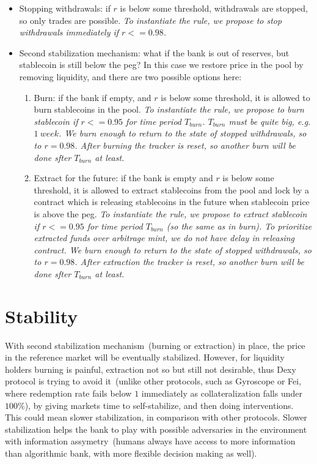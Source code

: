 \documentclass{article}   %
\newcommand{\sct}{stablecoin}
\newcommand{\dx}{Dexy}
\begin{document}
\begin{itemize}
   \item{Stopping withdrawals: } if $r$ is below some threshold, withdrawals are stopped, so only trades are possible.  
   \em{To instantiate the rule, we propose to stop withdrawals immediately if $r <= 0.98$.}

   \item{Second stabilization mechanism: } what if the bank is out of reserves, but \sct{} is still below the peg? In this case we restore price in the pool by removing liquidity, and there are two possible options here:

   \begin{enumerate}
   \item{Burn: } if the bank if empty, and $r$ is below some threshold, it is allowed to burn \sct{}s in the pool. 
   \em{To instantiate the rule, we propose to burn \sct{} if $r <= 0.95$ for time period $T_{burn}$. $T_{burn}$ must be quite big, e.g. $1 {\ week}$. We burn enough to return to the state of stopped withdrawals, so to $r = 0.98$. After burning the tracker is reset, so another burn will be done sfter $T_{burn}$ at least.}

   \item{Extract for the future: } if the bank is empty and $r$ is below some threshold, it is allowed to extract \sct{}s from the pool and lock by a contract which is releasing \sct{}s in the future when \sct{} price is above the peg.
   \em{To instantiate the rule, we propose to extract \sct{} if $r <= 0.95$ for time period $T_{burn}$ (so the same as in burn). 
   To prioritize extracted funds over arbitrage mint, we do not have delay in releasing contract. We burn enough to return to the state of stopped withdrawals, so to $r = 0.98$. After extraction the tracker is reset, so another burn will be done sfter $T_{burn}$ at least.}
   \end{enumerate}
\end{itemize} 

\section{Stability}

With second stabilization mechanism~(burning or extraction) in place, the price in the reference market will be eventually stabilized. However, for liquidity holders burning is painful, extraction not so but still not desirable, thus \dx{} protocol is trying to avoid it~(unlike other protocols, such as Gyroscope or Fei, where redemption rate fails below $1$ immediately as collateralization falls under $100\%$), by giving markets time to self-stabilize, and then doing interventions. This could mean slower stabilization, in comparison with other protocols. Slower stabilization helps the bank to play with possible adversaries in the environment with information assymetry~(humans always have access to more information than algorithmic bank, with more flexible decision making as well).
\end{document}
